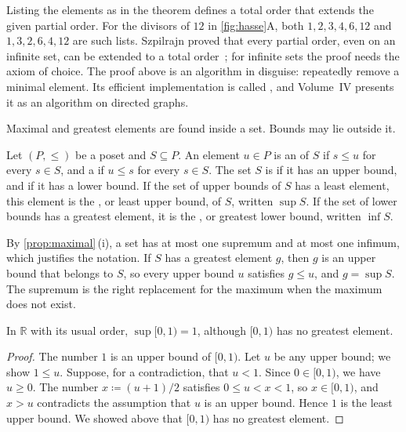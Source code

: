 Listing the elements as in the theorem defines a total order that extends the given partial order. For the divisors of $12$ in \cref{fig:hasse}A, both $1,2,3,4,6,12$ and $1,3,2,6,4,12$ are such lists. Szpilrajn proved that every partial order, even on an infinite set, can be extended to a total order~\cite{szpilrajn1930}; for infinite sets the proof needs the axiom of choice. The proof above is an algorithm in disguise: repeatedly remove a minimal element. Its efficient implementation is called , and Volume~IV presents it as an algorithm on directed graphs.

Maximal and greatest elements are found inside a set. Bounds may lie outside it.

\begin{definition}
\label{def:sup}
Let $(P,\le)$ be a poset and $S\subseteq P$. An element $u\in P$ is an  of $S$ if $s\le u$ for every $s\in S$, and a  if $u\le s$ for every $s\in S$. The set $S$ is  if it has an upper bound, and  if it has a lower bound. If the set of upper bounds of $S$ has a least element, this element is the , or least upper bound, of $S$, written $\sup S$. If the set of lower bounds has a greatest element, it is the , or greatest lower bound, written $\inf S$.
\end{definition}

By \cref{prop:maximal}\,(i), a set has at most one supremum and at most one infimum, which justifies the notation. If $S$ has a greatest element $g$, then $g$ is an upper bound that belongs to $S$, so every upper bound $u$ satisfies $g\le u$, and $g=\sup S$. The supremum is the right replacement for the maximum when the maximum does not exist.

\begin{proposition}
\label{prop:sup-interval}
In $\mathbb R$ with its usual order, $\sup{[0,1)}=1$, although $[0,1)$ has no greatest element.
\end{proposition}

\begin{proof}
The number $1$ is an upper bound of $[0,1)$. Let $u$ be any upper bound; we show $1\le u$. Suppose, for a contradiction, that $u<1$. Since $0\in[0,1)$, we have $u\ge0$. The number $x\coloneqq(u+1)/2$ satisfies $0\le u<x<1$, so $x\in[0,1)$, and $x>u$ contradicts the assumption that $u$ is an upper bound. Hence $1$ is the least upper bound. We showed above that $[0,1)$ has no greatest element.
\end{proof}

